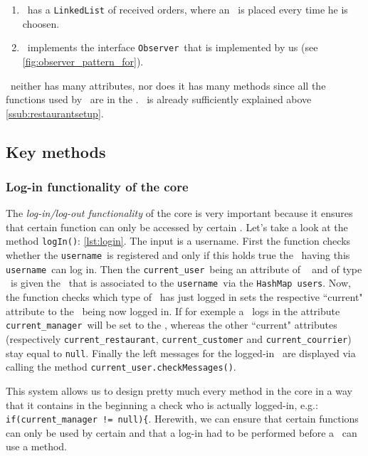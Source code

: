\begin{enumerate}
	\item \Courier~has a \lstinline|LinkedList| of received orders, where an \Order~is placed every time he is choosen.
	\item \Customer~implements the interface \lstinline|Observer|~that is implemented by us (see  \ref{fig:observer_pattern_for}).
\end{enumerate}

\Manager~neither has many attributes, nor does it has many methods since all the functions used by \Manager~are in the \Core.
\Restaurant~is already sufficiently explained above \ref{ssub:restaurantsetup}.


\subsection{Key methods} %
\label{sub:key_methods}


\subsubsection{Log-in functionality of the core} %
\label{ssub:log_in_functionality_of_the_core}

The \emph{log-in/log-out functionality} of the core is very important because it ensures that certain function can only be accessed by certain \User. Let's take a look at the method \lstinline|logIn()|: \ref{lst:login}. The input is a username. First the function checks whether the \lstinline|username|~is registered and only if this holds true the \User~having this \lstinline|username|~can log in. Then the \lstinline|current_user|~being an attribute of \Core~ and of type \User~is given the \User~that is associated to the \lstinline|username|~via the \lstinline|HashMap|~\lstinline|users|. Now, the function checks which type of \User~has just logged in sets the respective ``current" attribute to the \User~being now logged in. If for exemple a \Manager~logs in the attribute \lstinline|current_manager|~will be set to the \User, whereas the other ``current" attributes (respectively \lstinline|current_restaurant|, \lstinline|current_customer| and \lstinline|current_courrier|) stay equal to \lstinline|null|. Finally the left messages for the logged-in \User~are displayed via calling the method \lstinline|current_user.checkMessages()|.

This system allows us to design pretty much every method in the core in a way that it contains in the beginning a check who is actually logged-in, e.g.: \lstinline|if(current_manager != null){|. Herewith, we can ensure that certain functions can only be used by certain \User and that a log-in had to be performed before a \User~can use a method.

